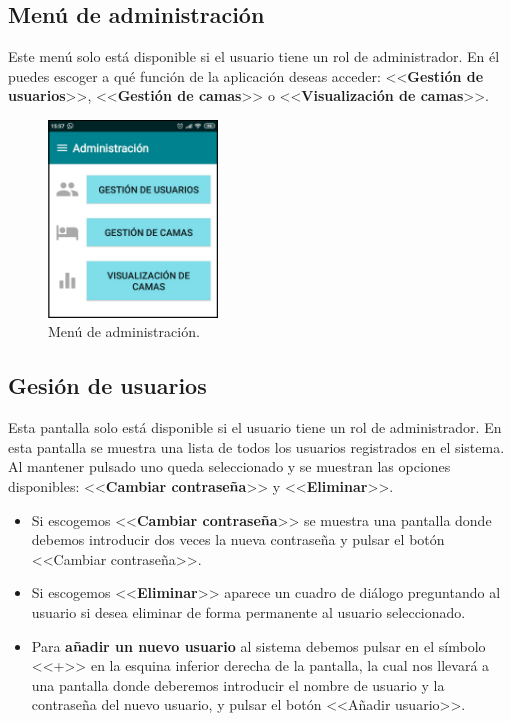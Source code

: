 \subsection{Menú de administración}

Este menú solo está disponible si el usuario tiene un rol de administrador. En él puedes escoger a qué función de la aplicación deseas acceder: <<\textbf{Gestión de usuarios}>>, <<\textbf{Gestión de camas}>> o <<\textbf{Visualización de camas}>>. 

\begin{figure}[H]
	\centering
	\includegraphics[width=0.4\textwidth]{../img/menudeadministracion.png}
	\caption{Menú de administración.}
	\label{fig:menudeadministracion}
\end{figure}

\subsection{Gesión de usuarios}

Esta pantalla solo está disponible si el usuario tiene un rol de administrador. En esta pantalla se muestra una lista de todos los usuarios registrados en el sistema. Al mantener pulsado uno queda seleccionado y se muestran las opciones disponibles: <<\textbf{Cambiar contraseña}>> y <<\textbf{Eliminar}>>.

\begin{itemize}
	\item Si escogemos <<\textbf{Cambiar contraseña}>> se muestra una pantalla donde debemos introducir dos veces la nueva contraseña y pulsar el botón <<Cambiar contraseña>>.
	\item Si escogemos <<\textbf{Eliminar}>> aparece un cuadro de diálogo preguntando al usuario si desea eliminar de forma permanente al usuario seleccionado. 
	\item Para \textbf{añadir un nuevo usuario} al sistema debemos pulsar en el símbolo <<+>> en la esquina inferior derecha de la pantalla, la cual nos llevará a una pantalla donde deberemos introducir el nombre de usuario y la contraseña del nuevo usuario, y pulsar el botón <<Añadir usuario>>. 
\end{itemize}  

